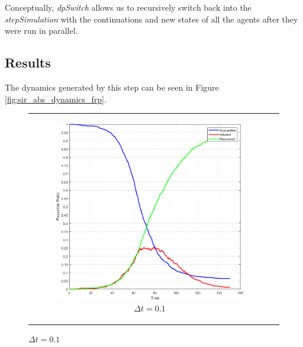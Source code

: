 Conceptually, \textit{dpSwitch} allows us to recursively switch back into the \textit{stepSimulation} with the continuations and new states of all the agents after they were run in parallel. 

\subsection{Results}
\label{sub:timedriven_results}

The dynamics generated by this step can be seen in Figure \ref{fig:sir_abs_dynamics_frp}. 

\begin{figure}
\begin{center}
	\begin{tabular}{c c}
		\begin{subfigure}[b]{0.4\textwidth}
			\centering
			\includegraphics[width=1\textwidth, angle=0]{./fig/timedriven/SIR_Yampa/SIR_Yampa_dt01.png}
			\caption{$\Delta t = 0.1$}
			\label{fig:sir_abs_approximating_01dt_1000agents}
		\end{subfigure}
		
		&
    	

\end{tabular}
\end{center}
\end{figure}
